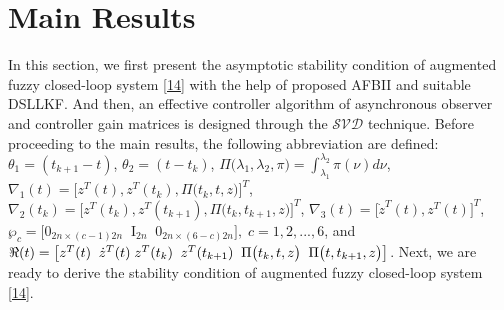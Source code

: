 \documentclass[preprint,11pt]{elsarticle}
\begin{document}
\section{Main Results}
In this section, we first present the asymptotic stability condition of augmented fuzzy closed-loop system \eqref{14} with the help of proposed AFBII and suitable DSLLKF. And then, an effective controller algorithm of asynchronous observer and controller gain matrices is designed through the $\mathcal{SVD}$ technique.
Before proceeding to the main results, the following abbreviation are defined: $\theta_1=(t_{k+1}-t)$, $\theta_2=(t-t_{k})$,
$\Pi\big(\lambda_1,\lambda_2,\pi\big)=\int^{\lambda_2}_{\lambda_1}\pi(\nu)d\nu$,
$\nabla_1(t)=\big[ z^T(t),z^T(t_k),\Pi\big(t_k,t,{z}\big) \big]^T$, $\nabla_2(t_k)=\big[ z^T(t_k),z^T(t_{k+1}),\Pi\big(t_k,t_{k+1},{z}\big) \big]^T$,
$\nabla_3(t)=\big[ \dot{z}^T(t),z^T(t) \big]^T$,
$\wp_c=\big[0_{2n\times(c-1)2n}\;\; \mathrm{I}_{2n}\;\;0_{2n\times(6-c)2n}  \big],\;c=1,2,...,6$, and
$\Re(t)=\big[ z^T(t)\;\;\dot{z}^T(t)\\\;z^T(t_k)\;\;z^T(t_{k+1}) \;\;\Pi\big(t_{k},t,{z}\big)\;\;\Pi\big(t,t_{k+1},{z}\big) \big]$.
Next, we are ready to derive the stability condition of augmented fuzzy closed-loop system \eqref{14}.
\end{document}
